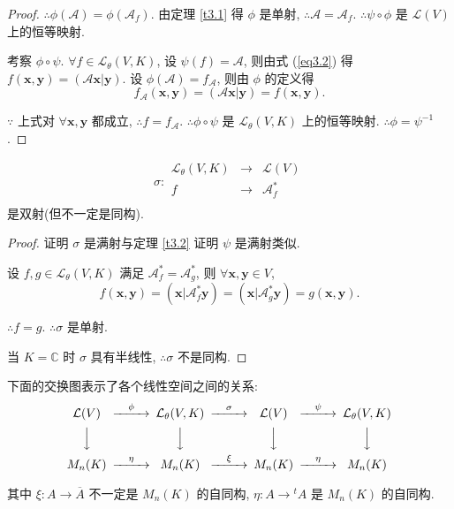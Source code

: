 \documentclass{ctexart}
\begin{document}
\begin{proof}
    $\therefore\phi(\mathcal{A})=\phi(\mathcal{A}_f)$. 由定理 \ref{t3.1} 得 $\phi$ 是单射, $\therefore\mathcal{A}=\mathcal{A}_f$. $\therefore\psi\circ\phi$ 是 $\mathcal{L}(V)$ 上的恒等映射.
    
    考察 $\phi\circ\psi$. $\forall f\in\mathcal{L}_\theta(V,K)$, 设 $\psi(f)=\mathcal{A}$, 则由式 (\ref{eq3.2}) 得 $f(\boldsymbol{x},\boldsymbol{y})=(\mathcal{A}\boldsymbol{x}|\boldsymbol{y})$. 设 $\phi(\mathcal{A})=f_\mathcal{A}$, 则由 $\phi$ 的定义得
    \[f_\mathcal{A}(\boldsymbol{x},\boldsymbol{y})=(\mathcal{A}\boldsymbol{x}|\boldsymbol{y})=f(\boldsymbol{x},\boldsymbol{y}).\]
    
    $\because$ 上式对 $\forall\boldsymbol{x},\boldsymbol{y}$ 都成立, $\therefore f=f_\mathcal{A}$. $\therefore\phi\circ\psi$ 是 $\mathcal{L}_\theta(V,K)$ 上的恒等映射. $\therefore\phi=\psi^{-1}$.
\end{proof}
\begin{theorem}
    \[\sigma:\begin{array}{rcl}
        \mathcal{L}_\theta(V,K) & \to & \mathcal{L}(V) \\
        f & \to & \mathcal{A}^*_f \\
    \end{array}\]
    是双射(但不一定是同构).
\end{theorem}
\begin{proof}
    证明 $\sigma$ 是满射与定理 \ref{t3.2} 证明 $\psi$ 是满射类似.

    设 $f,g\in\mathcal{L}_\theta(V,K)$ 满足 $\mathcal{A}^*_f=\mathcal{A}^*_g$, 则 $\forall\boldsymbol{x},\boldsymbol{y}\in V$,
    \[f(\boldsymbol{x},\boldsymbol{y})=(\boldsymbol{x}|\mathcal{A}^*_f\boldsymbol{y})=(\boldsymbol{x}|\mathcal{A}^*_g\boldsymbol{y})=g(\boldsymbol{x},\boldsymbol{y}).\]

    $\therefore f=g$. $\therefore\sigma$ 是单射.

    当 $K=\mathbb{C}$ 时 $\sigma$ 具有半线性, $\therefore\sigma$ 不是同构.
\end{proof}
下面的交换图表示了各个线性空间之间的关系:
\[\begin{CD}
    \mathcal{L}(V) @>\phi>> \mathcal{L}_\theta(V,K) @>\sigma>> \mathcal{L}(V) @>\psi>> \mathcal{L}_\theta(V,K) \\
    @VVV @VVV @VVV @VVV \\
    M_n(K) @>\eta>> M_n(K) @>\xi>> M_n(K) @>\eta>> M_n(K)
\end{CD}\]

其中 $\xi:A\to\overline{A}$ 不一定是 $M_n(K)$ 的自同构, $\eta:A\to{}^tA$ 是 $M_n(K)$ 的自同构.
\end{document}
